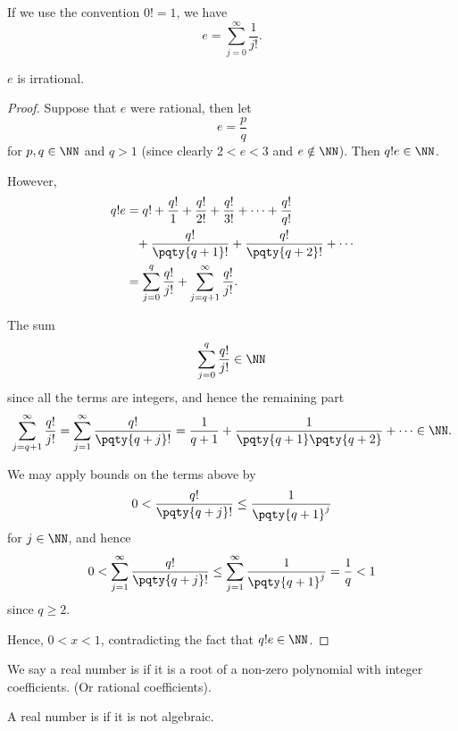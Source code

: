 \begin{notation}
    If we use the convention \(0! = 1\), we have
    \[
        e = \sum_{j = 0}^{\infty} \frac{1}{j!}.
    \]
\end{notation}

\begin{proposition}
    \(e\) is irrational.
\end{proposition}

\begin{proof}
    Suppose that \(e\) were rational, then let
    \[
        e = \frac{p}{q}
    \]
    for \(p, q \in \NN\) and \(q > 1\) (since clearly \(2 < e < 3\) and \(e \notin \NN\)). Then \(q! e \in \NN\).

    However,
    \begin{align*}
        q!e &= q! + \frac{q!}{1} + \frac{q!}{2!} + \frac{q!}{3!} + \cdots + \frac{q!}{q!} \\
        &\phantom{=} + \frac{q!}{\pqty{q + 1}!} + \frac{q!}{\pqty{q + 2}!} + \cdots \\
        &= \sum_{j = 0}^{q} \frac{q!}{j!} + \sum_{j = q + 1}^{\infty} \frac{q!}{j!}.
    \end{align*}

    The sum
    \[
        \sum_{j = 0}^{q} \frac{q!}{j!} \in \NN
    \]
    since all the terms are integers, and hence the remaining part
    \[
        \sum_{j = q + 1}^{\infty} \frac{q!}{j!} = \sum_{j = 1}^{\infty} \frac{q!}{\pqty{q + j}!} = \frac{1}{q + 1} + \frac{1}{\pqty{q + 1} \pqty{q + 2}} + \cdots \in \NN.
    \]

    We may apply bounds on the terms above by
    \[
        0 < \frac{q!}{\pqty{q + j}!} \leq \frac{1}{\pqty{q + 1}^j}
    \]
    for \(j \in \NN\), and hence
    \[
        0 < \sum_{j = 1}^{\infty} \frac{q!}{\pqty{q + j}!} \leq \sum_{j = 1}^{\infty} \frac{1}{\pqty{q + 1}^j} = \frac{1}{q} < 1
    \]
    since \(q \geq 2\).

    Hence, \(0 < x < 1\), contradicting the fact that \(q! e \in \NN\).
\end{proof}

\begin{definition}
    We say a real number is  if it is a root of a non-zero polynomial with integer coefficients. (Or rational coefficients).

    A real number is  if it is not algebraic.
\end{definition}

